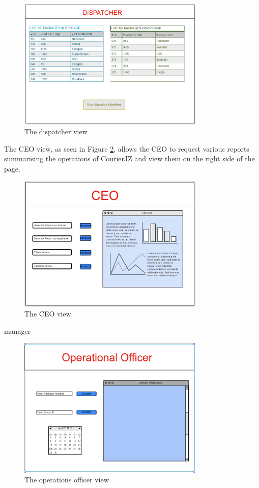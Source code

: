 \documentclass[paper=a4, fontsize=11pt]{scrartcl} %
\numberwithin{equation}{section} %
\numberwithin{figure}{section} %
\numberwithin{table}{section} %
\begin{document}
\begin{figure}[hbt!]
\centering
\includegraphics[width=3.5in]{pictures/dispatcherBefore.png}
\caption{The dispatcher view}
\label{DispatcherBefore}
\end{figure}

The CEO view, as seen in Figure \ref{CEOView}, allows the CEO to request various reports summarising the operations of CourierJZ and view them on the right side of the page.
\\

\begin{figure}[hbt!]
\centering
\includegraphics[width=3.5in]{pictures/CEO.png}
\caption{The CEO view}
\label{CEOView}
\end{figure}

manager
\\

\begin{figure}[hbt!]
\centering
\includegraphics[width=3.5in]{pictures/operational_officer.png}
\caption{The operations officer view}
\label{OperationsView}
\end{figure}
\end{document}
